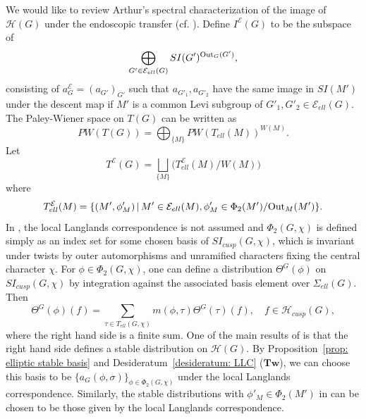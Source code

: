 \documentclass[11pt,letterpaper]{amsart}
\numberwithin{equation}{section}
\begin{document}
We would like to review Arthur's spectral characterization of the image of $\mathcal{H}(G)$ under the endoscopic transfer (cf. \cite{Art96}). Define $I^{\mathcal{E}}(G)$ to be the subspace of 
\[
\bigoplus_{G' \in \mathcal{E}_{ell}(G)} SI(G')^{{\rm Out}_{G}(G')},
\]
consisting of $a^{\mathcal{E}}_{G} = (a_{G'})_{G'}$ such that $a_{G'_1}, a_{G'_2}$ have the same image in $SI(M')$ under the descent map if $M'$ is a common Levi subgroup of $G'_1, G'_2 \in \mathcal{E}_{ell}(G)$. The Paley-Wiener space on $T(G)$ can be written as
\[
PW(T(G)) = \bigoplus_{\{M\}} PW(T_{ell}(M))^{W(M)}.
\]
Let
\[
T^{\mathcal{E}}(G) = \bigsqcup_{\{M\}} \Big( T^{\mathcal{E}}_{ell}(M) / W(M) \Big)
\]
where
\[
T^{\mathcal{E}}_{ell}(M) = \{ (M' , \phi'_M) \, | \, M' \in \mathcal{E}_{ell}(M), \phi'_M \in \Phi_{2}(M')/{\rm Out}_{M}(M')\}.
\]
In \cite{Art96}, the local Langlands correspondence is not assumed and $\Phi_2(G, \chi)$ is defined simply as an index set for some chosen basis of $SI_{cusp}(G, \chi)$, which is invariant under twists by outer automorphisms and unramified characters fixing the central character $\chi$. For $\phi \in \Phi_2(G, \chi)$, one can define a distribution $\Theta^{G}(\phi)$ on $SI_{cusp}(G, \chi)$ by integration against the associated basis element over $\Sigma_{ell}(G)$. Then  
\[
\Theta^{G}(\phi)(f) = \sum_{\tau \in T_{ell}(G, \chi)} m(\phi, \tau) \Theta^{G}(\tau)(f), \quad f \in \mathcal{H}_{cusp}(G),
\]
where the right hand side is a finite sum. One of the main results of \cite{Art96} is that the right hand side defines a stable distribution on $\mathcal{H}(G)$. By Proposition~\ref{prop: elliptic stable basis} and Desideratum~\ref{desideratum: LLC} ($\mathbf{Tw}$), we can choose this basis to be $\{a_{G}(\phi, \sigma)\}_{\phi \in \Phi_2(G, \chi)}$ under the local Langlands correspondence. Similarly, the stable distributions with $\phi'_M \in \Phi_{2}(M')$ in \cite{Art96} can be chosen to be those given by the local Langlands correspondence.
\end{document}
